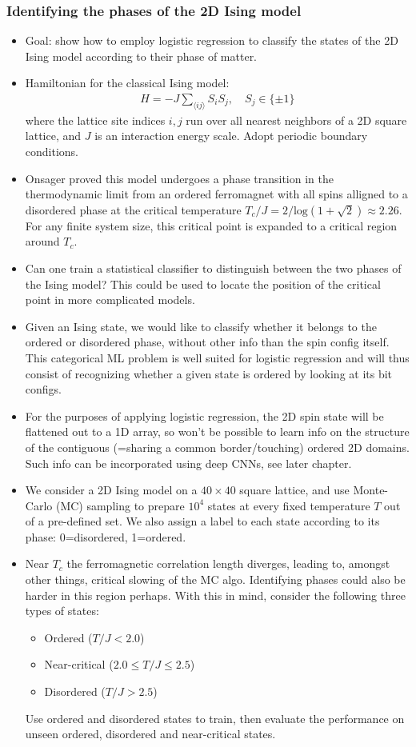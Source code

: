 \documentclass[norsk,a4paper,11pt]{article}
\begin{document}
\subsubsection{Identifying the phases of the 2D Ising model}
\begin{itemize}
	\item Goal: show how to employ logistic regression to classify the states of the 2D Ising model according to their phase of matter.
	\item Hamiltonian for the classical Ising model:
	\begin{align}
		H = -J \sum_{\langle ij \rangle} S_i S_j, \quad S_j \in \{ \pm 1 \}
	\end{align}
	where the lattice site indices $i, j$ run over all nearest neighbors of a 2D square lattice, and $J$ is an interaction energy scale. Adopt periodic boundary conditions. 
	\item Onsager proved this model undergoes a phase transition in the thermodynamic limit from an ordered ferromagnet with all spins alligned to a disordered phase at the critical temperature $T_c/J = 2/\text{log} (1 + \sqrt{2}) \approx 2.26$. For any finite system size, this critical point is expanded to a critical region around $T_c$. 
	\item Can one train a statistical classifier to distinguish between the two phases of the Ising model? This could be used to locate the position of the critical point in more complicated models.
	\item Given an Ising state, we would like to classify whether it belongs to the ordered or disordered phase, without other info than the spin config itself. This categorical ML problem is well suited for logistic regression and will thus consist of recognizing whether a given state is ordered by looking at its bit configs.
	\item For the purposes of applying logistic regression, the 2D spin state will be flattened out to a 1D array, so won't be possible to learn info on the structure of the contiguous (=sharing a common border/touching) ordered 2D domains. Such info can be incorporated using deep CNNs, see later chapter.
	\item We consider a 2D Ising model on a $40\times 40$ square lattice, and use Monte-Carlo (MC) sampling to prepare $10^4$ states at every fixed temperature $T$ out of a pre-defined set. We also assign a label to each state according to its phase: 0=disordered, 1=ordered.
	\item Near $T_c$ the ferromagnetic correlation length diverges, leading to, amongst other things, critical slowing of the MC algo. Identifying phases could also be harder in this region perhaps. With this in mind, consider the following three types of states:
	\begin{itemize}
		\item Ordered ($T/J < 2.0 $)
		\item Near-critical ($2.0 \leq T/J \leq 2.5 $)
		\item Disordered ($T/J > 2.5$)
	\end{itemize}
	Use ordered and disordered states to train, then evaluate the performance on unseen ordered, disordered and near-critical states.


\end{itemize}
\end{document}

